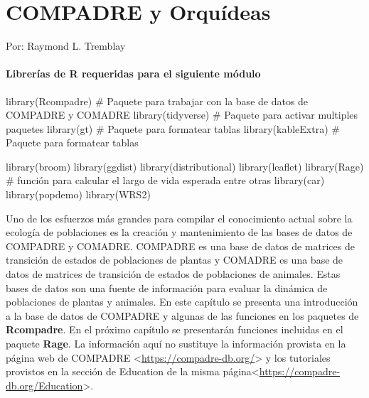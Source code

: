 \documentclass[
  12pt,
  letterpaper,
]{book}
\author{}
\date{}
\newenvironment{Shaded}{\begin{snugshade}}{\end{snugshade}}
\newcommand{\CommentTok}[1]{\textcolor[rgb]{0.37,0.37,0.37}{#1}}
\newcommand{\FunctionTok}[1]{\textcolor[rgb]{0.28,0.35,0.67}{#1}}
\newcommand{\NormalTok}[1]{\textcolor[rgb]{0.00,0.23,0.31}{#1}}
\renewcommand*\contentsname{Table of contents}
\newcommand\contentsname{Table of contents}
\begin{document}
\frontmatter

\renewcommand*\contentsname{Table of contents}
{
\hypersetup{linkcolor=}
\setcounter{tocdepth}{2}
\tableofcontents
}

\mainmatter
\chapter{COMPADRE y Orquídeas}\label{Compadre}

Por: Raymond L. Tremblay

\subsubsection{Librerías de R requeridas para el siguiente
módulo}\label{libreruxedas-de-r-requeridas-para-el-siguiente-muxf3dulo}

\begin{Shaded}
\begin{Highlighting}[]
\FunctionTok{library}\NormalTok{(Rcompadre) }\CommentTok{\# Paquete para trabajar con la base de datos de COMPADRE y COMADRE}
\FunctionTok{library}\NormalTok{(tidyverse) }\CommentTok{\# Paquete para activar multiples paquetes}
\FunctionTok{library}\NormalTok{(gt) }\CommentTok{\# Paquete para formatear tablas}
\FunctionTok{library}\NormalTok{(kableExtra) }\CommentTok{\# Paquete para formatear tablas}

\FunctionTok{library}\NormalTok{(broom)}
\FunctionTok{library}\NormalTok{(ggdist)}
\FunctionTok{library}\NormalTok{(distributional)}
\FunctionTok{library}\NormalTok{(leaflet)}
\FunctionTok{library}\NormalTok{(Rage) }\CommentTok{\# función para calcular el largo de vida esperada entre otras}
\FunctionTok{library}\NormalTok{(car)}
\FunctionTok{library}\NormalTok{(popdemo)}
\FunctionTok{library}\NormalTok{(WRS2)}
\end{Highlighting}
\end{Shaded}

Uno de los esfuerzos más grandes para compilar el conocimiento actual
sobre la ecología de poblaciones es la creación y mantenimiento de las
bases de datos de COMPADRE y COMADRE. COMPADRE es una base de datos de
matrices de transición de estados de poblaciones de plantas y COMADRE es
una base de datos de matrices de transición de estados de poblaciones de
animales. Estas bases de datos son una fuente de información para
evaluar la dinámica de poblaciones de plantas y animales. En este
capítulo se presenta una introducción a la base de datos de COMPADRE y
algunas de las funciones en los paquetes de \textbf{Rcompadre}. En el
próximo capítulo se presentarán funciones incluidas en el paquete
\textbf{Rage}. La información aquí no sustituye la información provista
en la página web de COMPADRE
\textless{}\url{https://compadre-db.org/}\textgreater{} y los tutoriales
provistos en la sección de Education de la misma
página\textless{}\url{https://compadre-db.org/Education}\textgreater.
\end{document}
